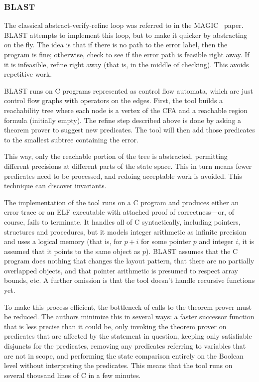 \documentclass{article}
\begin{document}
\begin{multicols}{2}
\subsubsection{BLAST~\cite{henzinger03software}}

The classical abstract-verify-refine loop was referred to in the
MAGIC~\cite{776863} paper.  BLAST attempts to implement this loop, but
to make it quicker by abstracting on the fly.  The idea is that if
there is no path to the error label, then the program is fine;
otherwise, check to see if the error path is feasible right away.  If
it is infeasible, refine right away (that is, in the middle of
checking).  This avoids repetitive work.

BLAST runs on C programs represented as control flow automata, which
are just control flow graphs with operators on the edges.  First, the
tool builds a reachability tree where each node is a vertex of the CFA
and a reachable region formula (initially empty).  The refine step
described above is done by asking a theorem prover to suggest new
predicates.  The tool will then add those predicates to the smallest
subtree containing the error.

This way, only the reachable portion of the tree is abstracted,
permitting different precisions at different parts of the state space.
This in turn means fewer predicates need to be processed, and redoing
acceptable work is avoided.  This technique can discover invariants.

The implementation of the tool runs on a C program and produces either
an error trace or an ELF executable with attached proof of
correctness---or, of course, fails to terminate.  It handles all of C
syntactically, including pointers, structures and procedures, but it
models integer arithmetic as infinite precision and uses a logical
memory (that is, for $p + i$ for some pointer $p$ and integer $i$, it
is assumed that it points to the same object as $p$).  BLAST assumes
that the C program does nothing that changes the layout pattern, that
there are no partially overlapped objects, and that pointer arithmetic
is presumed to respect array bounds, etc.  A further omission is that
the tool doesn't handle recursive functions yet.

To make this process efficient, the bottleneck of calls to the theorem
prover must be reduced.  The authors minimize this in several ways: a
faster successor function that is less precise than it could be, only
invoking the theorem prover on predicates that are affected by the
statement in question, keeping only satisfiable disjuncts for the
predicates, removing any predicates referring to variables that are
not in scope, and performing the state comparison entirely on the
Boolean level without interpreting the predicates.  This means that
the tool runs on several thousand lines of C in a few minutes.


\end{multicols}
\end{document}
